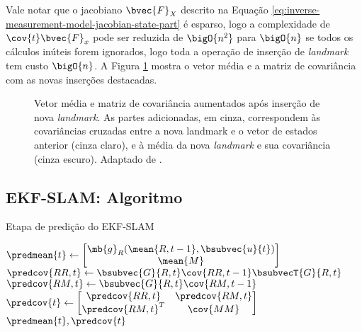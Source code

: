 Vale notar que o jacobiano $\bvec{F}_X$ descrito na Equação \ref{eq:inverse-measurement-model-jacobian-state-part} é esparso, logo a complexidade de $\cov{t}\bvec{F}_x$ pode ser reduzida de $\bigO{n^2}$ para $\bigO{n}$ se todos os cálculos inúteis forem ignorados, logo toda a operação de inserção de \textit{landmark} tem custo $\bigO{n}$. A Figura \ref{fig:ekf-slam-landmark-insertion} mostra o vetor média e a matriz de covariância com as novas inserções destacadas.

\begin{figure}[h]
  \centering
  
  \caption{Vetor média e matriz de covariância aumentados após inserção de nova \textit{landmark}. As partes adicionadas, em cinza, correspondem às covariâncias cruzadas entre a nova landmark e o vetor de estados anterior (cinza claro), e à média da nova \textit{landmark} e sua covariância (cinza escuro). Adaptado de \cite[p.~11]{jsola}.}
  \label{fig:ekf-slam-landmark-insertion}
\end{figure}

\subsection{EKF-SLAM: Algoritmo}

\begin{algorithm}
  \caption{Etapa de predição do EKF-SLAM}
  \label{alg:ekf-slam-prediction}
\begin{algorithmic}[1]
  \State $\predmean{t} \gets \begin{bmatrix}
    \mb{g}_R(\mean{R,t-1}, \bsubvec{u}{t}) \\ \mean{M}
  \end{bmatrix}$
  \State $\predcov{RR,t} \gets \bsubvec{G}{R, t}\cov{RR, t-1} \bsubvecT{G}{R,t}$
  \State $\predcov{RM, t} \gets \bsubvec{G}{R, t} \cov{RM, t-1}$
  \State $\predcov{t} \gets \begin{bmatrix}
    \predcov{RR, t} & \predcov{RM, t} \\
    \predcov{RM, t}^T & \cov{MM}
  \end{bmatrix}$
  \State \Return $\predmean{t}, \predcov{t}$
\EndProcedure
\end{algorithmic}
\end{algorithm}

